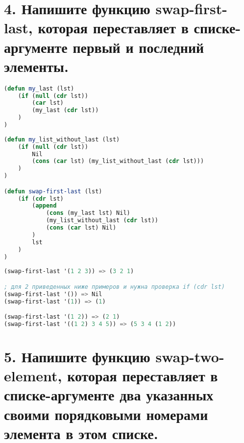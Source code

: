 \documentclass[12pt]{report}
\begin{document}
\section*{4. Напишите функцию swap-first-last, которая переставляет в списке-аргументе первый и последний элементы.}

\begin{lstlisting}[language=Lisp]
(defun my_last (lst) 
	(if (null (cdr lst))
		(car lst)
		(my_last (cdr lst))
	)
)
	
(defun my_list_without_last (lst)
	(if (null (cdr lst))
		Nil
		(cons (car lst) (my_list_without_last (cdr lst)))
	)
)

(defun swap-first-last (lst)
	(if (cdr lst)
		(append 
			(cons (my_last lst) Nil)
			(my_list_without_last (cdr lst)) 
			(cons (car lst) Nil)	
		)
		lst
	)
)
	
(swap-first-last '(1 2 3)) => (3 2 1)

; для 2 приведенных ниже примеров и нужна проверка if (cdr lst)
(swap-first-last '()) => Nil
(swap-first-last '(1)) => (1)

(swap-first-last '(1 2)) => (2 1)
(swap-first-last '((1 2) 3 4 5)) => (5 3 4 (1 2))
\end{lstlisting}

\section*{5. Напишите функцию swap-two-element, которая переставляет в списке-аргументе два указанных своими порядковыми номерами элемента в этом списке.}
\end{document}
